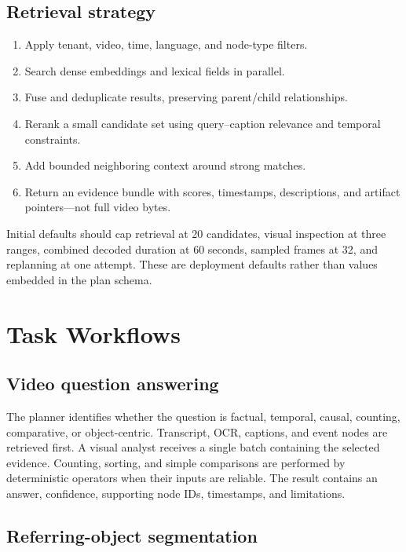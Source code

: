 \documentclass[11pt]{article}
\begin{document}
\subsection{Retrieval strategy}

\begin{enumerate}
  \item Apply tenant, video, time, language, and node-type filters.
  \item Search dense embeddings and lexical fields in parallel.
  \item Fuse and deduplicate results, preserving parent/child relationships.
  \item Rerank a small candidate set using query--caption relevance and temporal
  constraints.
  \item Add bounded neighboring context around strong matches.
  \item Return an evidence bundle with scores, timestamps, descriptions, and
  artifact pointers---not full video bytes.
\end{enumerate}

Initial defaults should cap retrieval at 20 candidates, visual inspection at
three ranges, combined decoded duration at 60 seconds, sampled frames at 32,
and replanning at one attempt. These are deployment defaults rather than values
embedded in the plan schema.

\section{Task Workflows}

\subsection{Video question answering}

The planner identifies whether the question is factual, temporal, causal,
counting, comparative, or object-centric. Transcript, OCR, captions, and event
nodes are retrieved first. A visual analyst receives a single batch containing
the selected evidence. Counting, sorting, and simple comparisons are performed
by deterministic operators when their inputs are reliable. The result contains
an answer, confidence, supporting node IDs, timestamps, and limitations.

\subsection{Referring-object segmentation}
\end{document}
